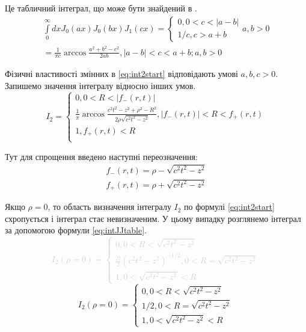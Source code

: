Це табличний інтеграл, що може бути знайдений в \cite[ст. 228]{SpecFunc1983}.
%
\begin{equation} \begin{aligned} \label{eq:intJ0J0J1tabel}
\int \limits_{0}^{\infty} d x J_0 \left( ax \right) 
J_0 \left( bx \right) J_1 \left( cx \right) = \begin{cases}
0, 0 < c < | a - b | \\ 
1/c, c > a + b
\end{cases} a, b > 0 \\
= \frac{1}{\pi c} \arccos \frac{a^2 + b^2 - c^2}{2ab},
| a - b | < c < a + b; a,b > 0
\end{aligned} \end{equation}

Фізичні властивості змінних в \eqref{eq:int2start} відповідають умові 
$ a,b,c > 0 $. Запишемо значення інтегралу відносно інших умов.
%
\begin{equation}
I_2 = \begin{cases}
0, 0 < R < | f_{-} \left( r, t \right) | \\
\frac{1}{\pi} \arccos \frac{c^2t^2 - z^2 + \rho^2 - R^2}
{2 \rho \sqrt{c^2t^2 - z^2}}, | f_{-} \left( r, t \right) | < R < 
f_{+} \left( r, t \right) \\ 1, f_{+} \left( r, t \right) < R \\
\end{cases}
\end{equation}

Тут для спрощення введено наступні переозначення:
%
\begin{equation*} \begin{aligned}
f_{-} \left( r, t \right) = \rho - \sqrt{c^2t^2 - z^2} \\
f_{+} \left( r, t \right) = \rho + \sqrt{c^2t^2 - z^2}
\end{aligned} \end{equation*}

Якщо $ \rho = 0 $, то область визначення інтегралу $ I_2 $ по формулі 
\eqref{eq:int2start} схропується і інтеграл стає невизначеним. У цьому випадку 
розглянемо інтеграл за допомогою формули \eqref{eq:intJJtable}.
%
\textcolor{lightgray}{ \begin{equation*}
I_2 \left( \rho = 0 \right) = \begin{cases}
0, 0 < R < \sqrt{c^2t^2 - z^2} \\
\frac{R}{2} \left( c^2t^2 - z^2 \right)^{-1/2}, 0 < R = \sqrt{c^2t^2 - z^2} \\ 
1, 0 < \sqrt{c^2t^2 - z^2} < R 
\end{cases}
\end{equation*} }
%
\begin{equation}
I_2 \left( \rho = 0 \right) = \begin{cases}
0, 0 < R < \sqrt{c^2t^2 - z^2} \\
1/2, 0 < R = \sqrt{c^2t^2 - z^2} \\ 
1, 0 < \sqrt{c^2t^2 - z^2} < R 
\end{cases}
\end{equation}
